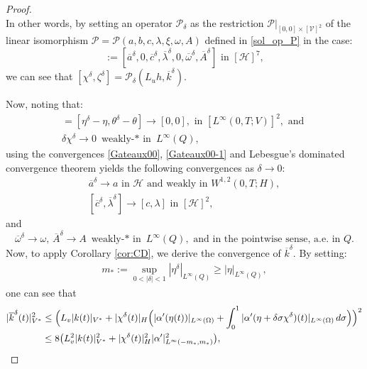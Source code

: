 \documentclass{sinst}
\numberwithin{equation}{section}
\theoremstyle{plain}
\theoremstyle{definition}
\def\sH{\mathscr{H}}
\def\sP{\mathscr{P}}
\def\sV{\mathscr{V}}
\begin{document}
\begin{proof}
\begin{equation}
  \end{equation}
  In other words, by setting an operator $\sP_\delta$ as the restriction $\sP|_{[0,0] \times [\sV]^2}$ of the linear isomorphism $\sP = \sP(a,b,c,\lambda,\xi,\omega,A)$ defined in \eqref{sol_op_P} in the case:
  \begin{equation}
    [a,b,c,\lambda,\xi,\omega,A] := [\overline{a}^\delta, 0, \overline{c}^\delta, \overline{\lambda}^\delta, 0, \overline{\omega}^\delta, \overline{A}^\delta] \mbox{ in } [\sH]^7,
  \end{equation}
  we can see that $[\chi^\delta, \zeta^\delta] = \sP_\delta(L_u h,\overline{k}^\delta)$. 
  
  Now, noting that:
  \begin{gather}
    [\delta \chi^\delta, \delta \zeta^\delta] = [\eta^\delta - \eta, \theta^\delta - \theta] \to [0,0], \mbox{ in } [L^\infty(0,T;V)]^2, \mbox{ and }
    \\
    \delta \chi^\delta \to 0 \mbox{ weakly-$*$ in } L^\infty(Q),
  \end{gather}
  using the convergences \eqref{Gateaux00}, \eqref{Gateaux00-1} and Lebesgue's dominated convergence theorem yields the following convergences as $\delta \to 0$:
  \begin{gather}
    \overline{a}^\delta \to a \mbox{ in } \sH \mbox{ and weakly in } W^{1,2}(0,T;H),
    \\
    [\overline{c}^\delta, \overline{\lambda}^\delta] \to [c, \lambda] \mbox{ in } [\sH]^2, \label{Gateaux03}
  \end{gather}
  and
  \begin{equation}
    \overline{\omega}^\delta \to \omega, \,\overline{A}^\delta \to A \mbox{ weakly-$*$ in } L^\infty(Q), \mbox{ and in the pointwise sense, a.e. in } Q. \label{Gateaux04}
  \end{equation}
  Now, to apply Corollary \ref{cor:CD}, we derive the convergence of $\overline{k}^\delta$. By setting:
  \begin{align}
    m_* := \sup_{0 < |\delta| < 1} |\eta^\delta|_{L^\infty(Q)} \geq |\eta|_{L^\infty(Q)},
  \end{align}
  one can see that
  \begin{align}
    |\overline{k}^\delta(t)|_{V^*}^2 &\leq \Bigl( L_v |k(t)|_{V^*} + |\chi^\delta(t)|_H \Bigl(|\alpha'(\eta(t))|_{L^\infty(\Omega)} + \int_0^1 |\alpha'(\eta + \delta \sigma \chi^\delta)(t)|_{L^\infty(\Omega)}\,d\sigma \Bigr) \Bigr)^2
    \\
    &\leq 8 \bigl( L_v^2 |k(t)|_{V^*}^2 + |\chi^\delta(t)|_H^2 |\alpha'|_{L^\infty(-m_*, m_*)}^2 \bigr), 

\end{align}
\end{proof}
\end{document}
